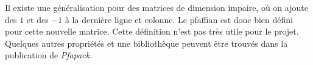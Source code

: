 \documentclass{subfiles}[../main.tex]
\begin{document}
                Il existe une généralisation pour des matrices de dimension impaire,
                où on ajoute des $1$ et des $-1$ à la dernière ligne et colonne.
                Le pfaffian est donc bien défini pour cette nouvelle matrice.
                Cette définition n'est pas très utile pour le projet. Quelques
                autres propriétés et une bibliothèque peuvent être trouvés dans
                la publication de \textit{Pfapack}\cite{pfapack}.



\end{document}
